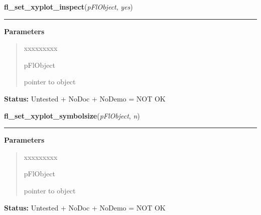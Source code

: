 \hspace{.8\funcindent}\begin{boxedminipage}{\funcwidth}

    \raggedright \textbf{fl\_set\_xyplot\_inspect}(\textit{pFlObject}, \textit{yes})

    \vspace{-1.5ex}

    \rule{\textwidth}{0.5\fboxrule}
\setlength{\parskip}{2ex}
\setlength{\parskip}{1ex}
      \textbf{Parameters}
      \vspace{-1ex}

      \begin{quote}
        \begin{Ventry}{xxxxxxxxx}

          \item[pFlObject]

          pointer to object

        \end{Ventry}

      \end{quote}

\textbf{Status:} Untested + NoDoc + NoDemo = NOT OK



    \end{boxedminipage}

    \label{xformslib:flxyplot:fl_set_xyplot_symbolsize}

    \vspace{0.5ex}

\hspace{.8\funcindent}\begin{boxedminipage}{\funcwidth}

    \raggedright \textbf{fl\_set\_xyplot\_symbolsize}(\textit{pFlObject}, \textit{n})

    \vspace{-1.5ex}

    \rule{\textwidth}{0.5\fboxrule}
\setlength{\parskip}{2ex}
\setlength{\parskip}{1ex}
      \textbf{Parameters}
      \vspace{-1ex}

      \begin{quote}
        \begin{Ventry}{xxxxxxxxx}

          \item[pFlObject]

          pointer to object

        \end{Ventry}

      \end{quote}

\textbf{Status:} Untested + NoDoc + NoDemo = NOT OK



    \end{boxedminipage}

